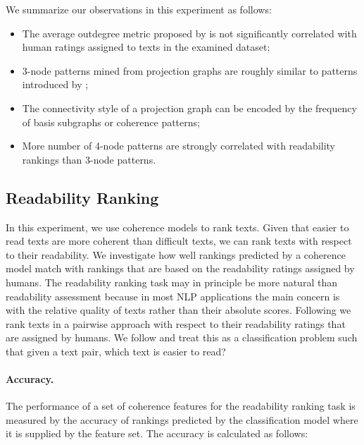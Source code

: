 We summarize our observations in this experiment as follows: 

\begin{itemize}

	\item The average outdegree metric proposed by  is not significantly correlated with human ratings assigned to texts in the examined dataset;

	\item 3-node patterns mined from projection graphs are roughly similar to patterns introduced by ;

	\item The connectivity style of a projection graph can be encoded by the frequency of basis subgraphs or coherence patterns; 

	\item More number of 4-node patterns are strongly correlated with readability rankings than 3-node patterns.

\end{itemize}


\subsection{Readability Ranking} 
\label{subsec:Readability Ranking}

In this experiment, we use coherence models to rank texts. 
Given that easier to read texts are more coherent than difficult texts, we can rank texts with respect to their readability. 
We investigate how well rankings predicted by a coherence model match with rankings that are based on the  readability ratings assigned by humans. 
The readability ranking task may in principle be more natural than readability assessment because in most NLP applications the main concern is with the relative quality of texts rather than their absolute scores. 
Following  we rank texts in a pairwise approach with respect to their readability ratings that are assigned by humans. 
We follow  and treat this as a classification problem such that given a text pair, which text is easier to read?

\paragraph{Accuracy.}
The performance of a set of coherence features for the readability ranking task is measured by the accuracy of rankings  predicted by the classification model where it is supplied by the feature set. 
The accuracy is calculated as follows:

